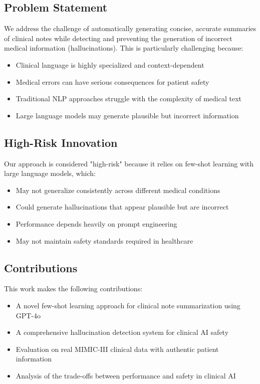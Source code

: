 \documentclass[sigconf]{acmart}
\begin{document}
\subsection{Problem Statement}
We address the challenge of automatically generating concise, accurate summaries of clinical notes while detecting and preventing the generation of incorrect medical information (hallucinations). This is particularly challenging because:
\begin{itemize}
    \item Clinical language is highly specialized and context-dependent
    \item Medical errors can have serious consequences for patient safety
    \item Traditional NLP approaches struggle with the complexity of medical text
    \item Large language models may generate plausible but incorrect information
\end{itemize}

\subsection{High-Risk Innovation}
Our approach is considered "high-risk" because it relies on few-shot learning with large language models, which:
\begin{itemize}
    \item May not generalize consistently across different medical conditions
    \item Could generate hallucinations that appear plausible but are incorrect
    \item Performance depends heavily on prompt engineering
    \item May not maintain safety standards required in healthcare
\end{itemize}

\subsection{Contributions}
This work makes the following contributions:
\begin{itemize}
    \item A novel few-shot learning approach for clinical note summarization using GPT-4o
    \item A comprehensive hallucination detection system for clinical AI safety
    \item Evaluation on real MIMIC-III clinical data with authentic patient information
    \item Analysis of the trade-offs between performance and safety in clinical AI
\end{itemize}
\end{document}
